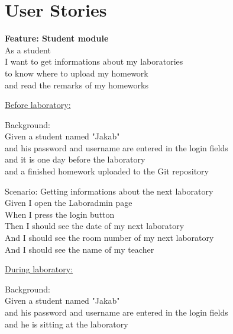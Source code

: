 \chapter{User Stories}
\label{user-stories}

\textbf{Feature: Student module}\\ \hspace*{1cm}
As a student\\ \hspace*{1cm}
I want to get informations about my laboratories\\ \hspace*{1cm}
to know where to upload my homework\\ \hspace*{1cm}
and read the remarks of my homeworks

\underline{Before laboratory:}

Background:\\ \hspace*{1cm}
Given a student named "Jakab"\\ \hspace*{1cm}
and his password and username are entered in the login fields\\ \hspace*{1cm}
and it is one day before the laboratory\\ \hspace*{1cm}
and a finished homework uploaded to the Git repository

Scenario: Getting informations about the next laboratory\\ \hspace*{1cm}
Given I open the Laboradmin page\\ \hspace*{1cm}
When I press the login button\\ \hspace*{1cm}
Then I should see the date of my next laboratory\\ \hspace*{1cm}
And  I should see the room number of my next laboratory\\ \hspace*{1cm}
And I should see the name of my teacher

\underline{During laboratory:}

Background:\\ \hspace*{1cm}
Given a student named "Jakab"\\ \hspace*{1cm}
and his password and username are entered in the login fields\\ \hspace*{1cm}
and he is sitting at the laboratory

